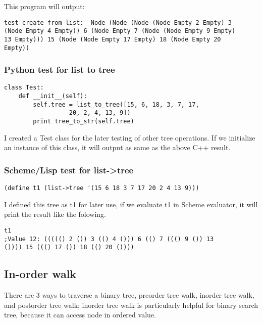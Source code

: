 \documentclass{article}
\begin{document}
This program will output:
\begin{verbatim}
test create from list:  Node (Node (Node (Node Empty 2 Empty) 3 
(Node Empty 4 Empty)) 6 (Node Empty 7 (Node (Node Empty 9 Empty) 
13 Empty))) 15 (Node (Node Empty 17 Empty) 18 (Node Empty 20 
Empty))
\end{verbatim}

\subsubsection*{Python test for list to tree}
\lstset{language=python}
\begin{lstlisting}
class Test:
    def __init__(self):
        self.tree = list_to_tree([15, 6, 18, 3, 7, 17, 
                  20, 2, 4, 13, 9])
        print tree_to_str(self.tree)
\end{lstlisting}

I created a Test class for the later testing of other tree operations.
If we initialize an instance of this class, it will output as same as
the above C++ result.

\subsubsection*{Scheme/Lisp test for list->tree}
\lstset{language=lisp}
\begin{lstlisting}
(define t1 (list->tree '(15 6 18 3 7 17 20 2 4 13 9)))
\end{lstlisting}

I defined this tree as t1 for later use, if we evaluate t1 in Scheme
evaluator, it will print the result like the folowing.

\begin{verbatim}
t1
;Value 12: ((((() 2 ()) 3 (() 4 ())) 6 (() 7 ((() 9 ()) 13 
()))) 15 ((() 17 ()) 18 (() 20 ())))
\end{verbatim}

\subsection{In-order walk}

There are 3 ways to traverse a binary tree, preorder tree walk, inorder 
tree walk, and postorder tree walk; inorder tree walk is particularly helpful
for binary search tree, because it can access node in ordered value.
\end{document}
